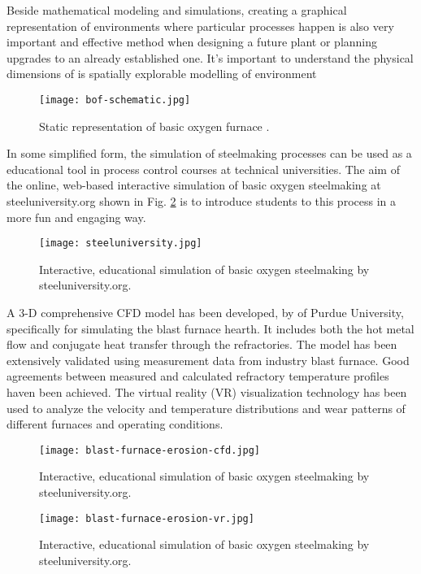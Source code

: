 Beside mathematical modeling and simulations, creating a graphical representation of environments where particular processes happen is also very important and effective method when designing a future plant or planning upgrades to an already established one. It's important to understand the physical dimensions of  is  spatially explorable modelling of environment

\begin{figure}[h!]
	\centering
	\texttt{[image: bof-schematic.jpg]}
	\caption{Static representation of basic oxygen furnace \citep{Doh2013}.}
	\label{o:m4}
\end{figure}

In some simplified form, the simulation of steelmaking processes can be used as a educational tool in process control courses at technical universities. The aim of the online, web-based interactive simulation of basic oxygen steelmaking at steeluniversity.org shown in Fig. \ref{o:m5} is to introduce students to this process in a more fun and engaging way.

\begin{figure}[h!]
	\centering
	\texttt{[image: steeluniversity.jpg]}
	\caption{Interactive, educational simulation of basic oxygen steelmaking by steeluniversity.org.}
	\label{o:m5}
\end{figure}

A 3-D comprehensive CFD model has been developed, by \citet{Zheng2014} of Purdue University, specifically for simulating the blast furnace hearth. It includes both the hot metal flow and conjugate heat transfer through the refractories. The model has been extensively validated using measurement data from
industry blast furnace. Good agreements between measured and calculated refractory temperature profiles haven been achieved. The virtual reality (VR) visualization technology has been used to analyze the velocity and temperature distributions and wear patterns of different furnaces and operating conditions.

\begin{figure}[h!]
	\centering
	\texttt{[image: blast-furnace-erosion-cfd.jpg]}
	\caption{Interactive, educational simulation of basic oxygen steelmaking by steeluniversity.org.}
	\label{o:m6}
\end{figure}

\begin{figure}[h!]
	\centering
	\texttt{[image: blast-furnace-erosion-vr.jpg]}
	\caption{Interactive, educational simulation of basic oxygen steelmaking by steeluniversity.org.}
	\label{o:m7}
\end{figure}

